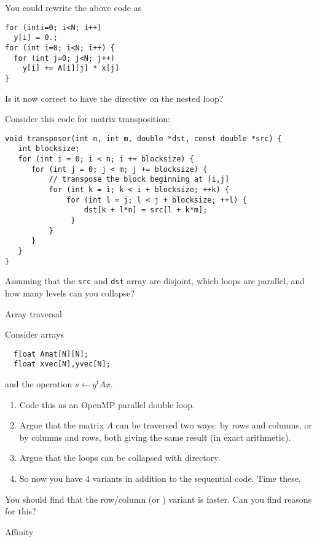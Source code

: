 \begin{exercise}
  You could rewrite the above code as
\begin{lstlisting}
for (inti=0; i<N; i++)
  y[i] = 0.;
for (int i=0; i<N; i++) {
  for (int j=0; j<N; j++)
    y[i] += A[i][j] * x[j]
}
\end{lstlisting}
Is it now correct to have the  directive
on the nested loop?
\end{exercise}

\begin{exercise}
  Consider this code for matrix transposition:
\begin{lstlisting}
void transposer(int n, int m, double *dst, const double *src) {
   int blocksize;
   for (int i = 0; i < n; i += blocksize) {
      for (int j = 0; j < m; j += blocksize) {
          // transpose the block beginning at [i,j]
          for (int k = i; k < i + blocksize; ++k) {
              for (int l = j; l < j + blocksize; ++l) {
                  dst[k + l*n] = src[l + k*m];
               }
          }
      }
   }
}  
\end{lstlisting}
Assuming that the \lstinline{src} and \lstinline{dst}
array are disjoint, which loops are parallel, and how many
levels can you collapse?
\end{exercise}

 {Array traversal}
\label{sec:omp-row-col-major}

Consider arrays 
\begin{lstlisting}
  float Amat[N][N];
  float xvec[N],yvec[N];  
\end{lstlisting}
and the operation $s\leftarrow y^tAx$.

\begin{enumerate}
\item Code this as an OpenMP parallel double loop.
\item Argue that the matrix $A$ can be traversed two ways:
  by rows and columns, or by columns and rows, both
  giving the same result (in exact arithmetic).
\item Argue that the loops can be collapsed with 
  directory.
\item So now you have 4 variants in addition to the sequential code.
  Time these.
\end{enumerate}

You should find that the row/column (or ) variant
is faster. Can you find reasons for this?

 {Affinity}

